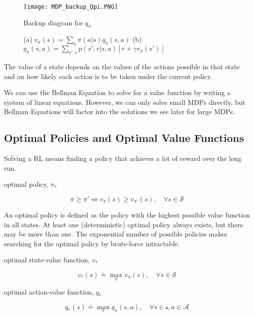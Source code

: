 \documentclass[sutton_barto_notes.tex]{subfiles}
\begin{document}
\begin{figure}[!h]
  \centering
  \texttt{[image: MDP\_backup\_Qpi.PNG]}
  \caption{Backup diagram for $q_\pi$}
  \label{fig:MDP_backup_qpi}
\end{figure}

\begin{figure}[!h]
    \centering
    \caption{ (a) $ v_\pi(s)=\sum_a \pi(a|s)q_\pi(s,a) $ (b) $ q_\pi(s,a)=\sum_{s',r}p(s',r|s,a)[r+\gamma v_\pi(s')] $ }
    \label{fig:MDPMDP}
\end{figure}
The value of a state depends on the values of the actions possible in that state and on how likely each action is to be taken under the current policy.

We can use the Bellman Equation to solve for a value function by writing a system of linear equations. However, we can only solve small MDPs directly, but Bellman Equations will factor into the solutions we see later for large MDPs.

\subsection{Optimal Policies and Optimal Value Functions}

Solving a RL means finding a policy that achieves a lot of reward over the long run.

\begin{definition}
optimal policy, $\pi_*$

$$ \pi \geq \pi' \iff v_\pi(s) \geq v_{\pi'}(s), \quad \forall s \in \mathcal{S} $$
\end{definition}
An optimal policy is defined as the policy with the highest possible value function in all states. At least one (deterministic) optimal policy always exists, but there may be more than one. The exponential number of possible policies makes searching for the optimal policy by brute-force intractable.

\begin{definition}
optimal state-value function, $v_*$

$$ v_*(s) \doteq \max_\pi v_\pi(s), \quad \forall s \in \mathcal{S} $$
\end{definition}

\begin{definition}
optimal action-value function, $q_*$

$$ q_*(s) \doteq \max_\pi q_\pi(s,a), \quad \forall s \in \mathcal{s}, a \in \mathcal{A} $$
\end{definition}
\end{document}
